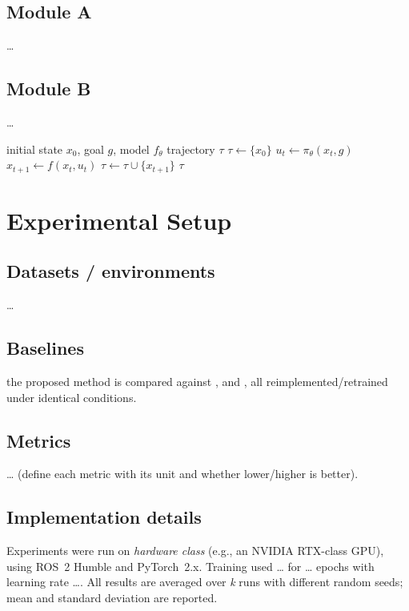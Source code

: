 \documentclass[conference]{IEEEtran}
\newcommand{\ours}{the proposed method}   %
\begin{document}
\subsection{Module A}
\ldots

\subsection{Module B}
\ldots

\begin{algorithm}[t]
\caption{Proposed procedure}
\label{alg:main}
\begin{algorithmic}[1]
\Require initial state $x_0$, goal $g$, model $f_\theta$
\Ensure trajectory $\tau$
\State $\tau \gets \{x_0\}$
  \State $u_t \gets \pi_\theta(x_t, g)$
  \State $x_{t+1} \gets f(x_t, u_t)$
  \State $\tau \gets \tau \cup \{x_{t+1}\}$
\EndFor
\State \Return $\tau$
\end{algorithmic}
\end{algorithm}

\section{Experimental Setup}
\label{sec:setup}

\subsection{Datasets / environments}
\ldots

\subsection{Baselines}
\ours{} is compared against \cite{ref_classic}, \cite{ref_learning} and
\cite{ref_transformer}, all reimplemented/retrained under identical conditions.

\subsection{Metrics}
\ldots{} (define each metric with its unit and whether lower/higher is better).

\subsection{Implementation details}
Experiments were run on \emph{hardware class} (e.g., an NVIDIA RTX-class GPU),
using ROS~2 Humble and PyTorch~2.x. Training used \ldots{} for \ldots{} epochs
with learning rate \ldots. All results are averaged over \emph{k} runs with
different random seeds; mean and standard deviation are reported.
\end{document}
